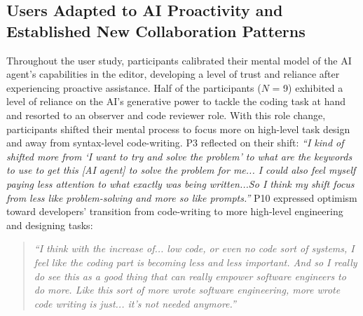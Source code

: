 \subsection{Users Adapted to AI Proactivity and Established New Collaboration Patterns}
Throughout the user study, participants calibrated their mental model of the AI agent's capabilities in the editor, developing a level of trust and reliance after experiencing proactive assistance.
Half of the participants ($N$ = 9) exhibited a level of reliance on the AI's generative power to tackle the coding task at hand and resorted to an observer and code reviewer role.
With this role change, participants shifted their mental process to focus more on high-level task design and away from syntax-level code-writing.
P3 reflected on their shift: \textit{``I kind of shifted more from `I want to try and solve the problem' to what are the keywords to use to get this [AI agent] to solve the problem for me... I could also feel myself paying less attention to what exactly was being written...So I think my shift focus from less like problem-solving and more so like prompts.''}
P10 expressed optimism toward developers' transition from code-writing to more high-level engineering and designing tasks:
\begin{quote}
    \textit{``I think with the increase of... low code, or even no code sort of systems, I feel like the coding part is becoming less and less important. And so I really do see this as a good thing that can really empower software engineers to do more. Like this sort of more wrote software engineering, more wrote code writing is just... it's not needed anymore.''}
\end{quote}

